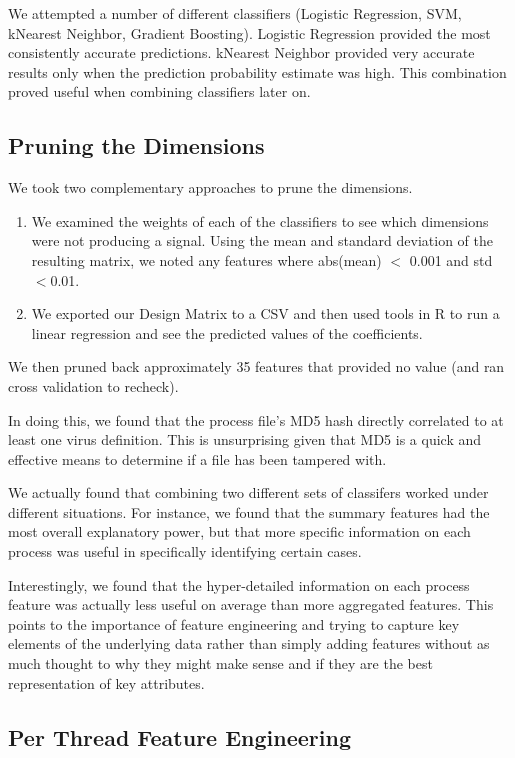\documentclass[11pt, oneside]{article}   	%
\begin{document}
We attempted a number of different classifiers (Logistic Regression, SVM, kNearest Neighbor, Gradient Boosting). Logistic Regression provided the most consistently accurate predictions. kNearest Neighbor provided very accurate results only when the prediction probability estimate was high. This combination proved useful when combining classifiers later on.

\subsection*{Pruning the Dimensions}

We took two complementary approaches to prune the dimensions.
\begin{enumerate}
  \item We examined the weights of each of the classifiers to see which dimensions were not producing a signal. Using the mean and standard deviation of the resulting matrix, we noted any features where abs(mean) $<$ 0.001 and std $< $0.01.
  \item We exported our Design Matrix to a CSV and then used tools in R to run a linear regression and see the predicted values of the coefficients. 
\end{enumerate}

We then pruned back approximately 35 features that provided no value (and ran cross validation to recheck).

In doing this, we found that the process file's MD5 hash directly correlated to at least one virus definition. This is unsurprising given that MD5 is a quick and effective means to determine if a file has been tampered with.

We actually found that combining two different sets of classifers worked under different situations. For instance, we found that the summary features had the most overall explanatory power, but that more specific information on each process was useful in specifically identifying certain cases.

Interestingly, we found that the hyper-detailed information on each process feature was actually less useful on average than more aggregated features. This points to the importance of feature engineering and trying to capture key elements of the underlying data rather than simply adding features without as much thought to why they might make sense and if they are the best representation of key attributes.

\subsection*{Per Thread Feature Engineering}
\end{document}
